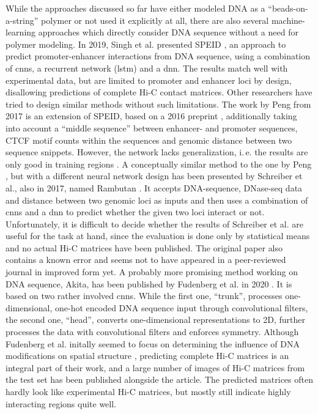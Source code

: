 While the approaches discussed so far have either modeled DNA as a ``beads-on-a-string'' polymer or not used it explicitly at all,
there are also several machine-learning approaches which directly consider DNA sequence without a need for polymer modeling.
In 2019, Singh et al. presented SPEID \cite{Singh2019}, an approach to predict promoter-enhancer interactions from DNA sequence,
using a combination of \acrshort{cnn}s, a recurrent network (\acrshort{lstm}) and a \acrshort{dnn}.
The results match well with experimental data, but are limited to promoter and enhancer loci by design, disallowing predictions of complete Hi-C contact matrices.
Other researchers have tried to design similar methods without such limitations.
The work by Peng from 2017 \cite{peng2017} is an extension of SPEID, based on a 2016 preprint \cite{Singh2016}, 
additionally taking into account a ``middle sequence'' between enhancer- and promoter sequences,
CTCF motif counts within the sequences and genomic distance between two sequence snippets. 
However, the network lacks generalization, i.\,e. the results are only good in training regions \cite[figs. 4, 5]{peng2017}.
A conceptually similar method to the one by Peng \cite{peng2017}, but with a different neural network design has been presented by Schreiber et al., also in 2017, 
named Rambutan \cite{Schreiber2017}.
It accepts DNA-sequence, DNase-seq data and distance between two genomic loci as inputs 
and then uses a combination of \acrshort{cnn}s and a \acrshort{dnn} to predict whether the given two loci interact or not. 
Unfortunately, it is difficult to decide whether the results of Schreiber et al. are useful for the task at hand, since the evaluation is done only by statistical means 
and no actual Hi-C matrices have been published.
The original paper \cite{Schreiber2017} also contains a known error and seems not to have appeared in a peer-reviewed journal in improved form 
yet. 
A probably more promising method working on DNA sequence, Akita, has been published by Fudenberg et al. in 2020 \cite{Fudenberg2020}.
It is based on two rather involved \acrlong{cnn}s. 
While the first one, ``trunk'', processes one-dimensional, one-hot encoded DNA sequence input through convolutional filters, the second one, ``head'', 
converts one-dimensional representations to 2D, further processes the data with convolutional filters and enforces symmetry.
Although Fudenberg et al. initally seemed to focus on determining the influence of DNA modifications on spatial structure \cite{Fudenberg2019},
predicting complete Hi-C matrices is an integral part of their work, 
and a large number of images of Hi-C matrices from the test set has been published alongside the article. 
The predicted matrices often hardly look like experimental Hi-C matrices, but mostly still indicate highly interacting regions quite well.

